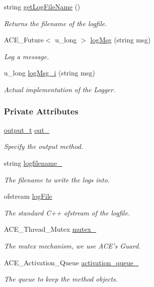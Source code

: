 \begin{CompactItemize}
string \hyperlink{classLogger_Loggera6}{get\-Log\-File\-Name} ()
\begin{CompactList}\small\item\em Returns the filename of the logfile.\item\end{CompactList}\item 
ACE\_\-Future$<$ u\_\-long $>$ \hyperlink{classLogger_Loggera7}{log\-Msg} (string msg)
\begin{CompactList}\small\item\em Log a message.\item\end{CompactList}\item 
u\_\-long \hyperlink{classLogger_Loggera8}{log\-Msg\_\-i} (string msg)
\begin{CompactList}\small\item\em Actual implementation of the Logger.\item\end{CompactList}\end{CompactItemize}
\subsubsection*{Private Attributes}
\begin{CompactItemize}
\item 
\hyperlink{logger_8h_a3}{output\_\-t} \hyperlink{classLogger_Loggero0}{out\_\-}
\begin{CompactList}\small\item\em Specify the output method.\item\end{CompactList}\item 
string \hyperlink{classLogger_Loggero1}{logfilename\_\-}
\begin{CompactList}\small\item\em The filename to write the logs into.\item\end{CompactList}\item 
ofstream \hyperlink{classLogger_Loggero2}{log\-File}
\begin{CompactList}\small\item\em The standard C++ ofstream of the logfile.\item\end{CompactList}\item 
ACE\_\-Thread\_\-Mutex \hyperlink{classLogger_Loggero3}{mutex\_\-}
\begin{CompactList}\small\item\em The mutex mechanism, we use ACE's Guard.\item\end{CompactList}\item 
ACE\_\-Activation\_\-Queue \hyperlink{classLogger_Loggero4}{activation\_\-queue\_\-}
\begin{CompactList}\small\item\em The queue to keep the method objects.\item\end{CompactList}\end{CompactItemize}


